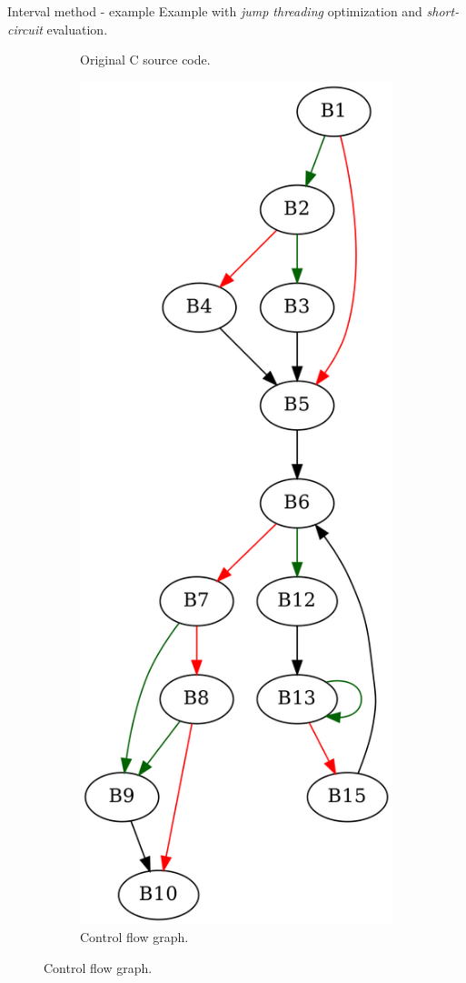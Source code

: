 \documentclass[aspectratio=1610]{beamer}
\begin{document}
\begin{frame}
{Interval method - example}
	Example with \textit{jump threading} optimization and \textit{short-circuit} evaluation.
	\begin{figure}[htbp]
		\centering
		\begin{subfigure}[b]{0.30\textwidth}
			\centering
			
			\caption{Original C source code.}
		\end{subfigure}
		\begin{subfigure}[b]{0.50\textwidth}
			\centering
			\includegraphics[height=0.6\paperheight]{inc/methods/interval/example/sample/f.png}
			\caption{Control flow graph.}
		\end{subfigure}
	\end{figure}
\end{frame}
\end{document}
